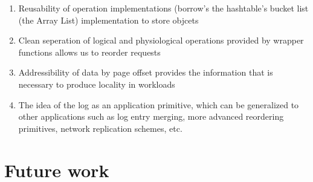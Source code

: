 \documentclass[letterpaper,twocolumn,english]{article}
\begin{document}
\begin{enumerate}
\item{Reusability of operation implementations (borrow's the hashtable's bucket list (the Array List) implementation to store objcets}
\item{Clean seperation of logical and physiological operations provided by wrapper functions allows us to reorder requests}
\item{Addressibility of data by page offset provides the information that is necessary to produce locality in workloads}
\item{The idea of the log as an application primitive, which can be generalized to other applications such as log entry merging, more advanced reordering primitives, network replication schemes, etc.} 
\end{enumerate}
%
%
%
%    
% 
%
%
%
%
%
%    
%
%

\section{Future work}
\end{document}
